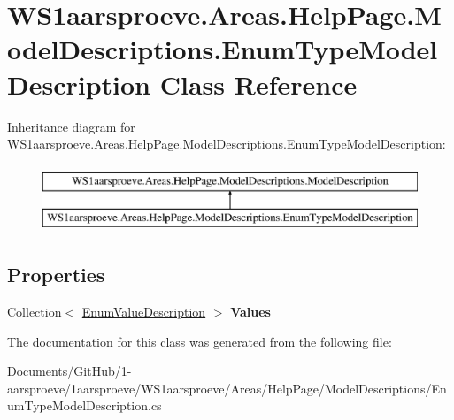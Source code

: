 \hypertarget{class_w_s1aarsproeve_1_1_areas_1_1_help_page_1_1_model_descriptions_1_1_enum_type_model_description}{}\section{W\+S1aarsproeve.\+Areas.\+Help\+Page.\+Model\+Descriptions.\+Enum\+Type\+Model\+Description Class Reference}
\label{class_w_s1aarsproeve_1_1_areas_1_1_help_page_1_1_model_descriptions_1_1_enum_type_model_description}
Inheritance diagram for W\+S1aarsproeve.\+Areas.\+Help\+Page.\+Model\+Descriptions.\+Enum\+Type\+Model\+Description\+:\begin{figure}[H]
\begin{center}
\leavevmode
\includegraphics[height=2.000000cm]{class_w_s1aarsproeve_1_1_areas_1_1_help_page_1_1_model_descriptions_1_1_enum_type_model_description}
\end{center}
\end{figure}
\subsection*{Properties}
\begin{DoxyCompactItemize}
\item 
\hypertarget{class_w_s1aarsproeve_1_1_areas_1_1_help_page_1_1_model_descriptions_1_1_enum_type_model_description_a3cedd9b70da15d6fea894f81bca90e24}{}Collection$<$ \hyperlink{class_w_s1aarsproeve_1_1_areas_1_1_help_page_1_1_model_descriptions_1_1_enum_value_description}{Enum\+Value\+Description} $>$ {\bfseries Values}\label{class_w_s1aarsproeve_1_1_areas_1_1_help_page_1_1_model_descriptions_1_1_enum_type_model_description_a3cedd9b70da15d6fea894f81bca90e24}

\end{DoxyCompactItemize}


The documentation for this class was generated from the following file\+:\begin{DoxyCompactItemize}
\item 
Documents/\+Git\+Hub/1-\/aarsproeve/1aarsproeve/\+W\+S1aarsproeve/\+Areas/\+Help\+Page/\+Model\+Descriptions/Enum\+Type\+Model\+Description.\+cs\end{DoxyCompactItemize}

